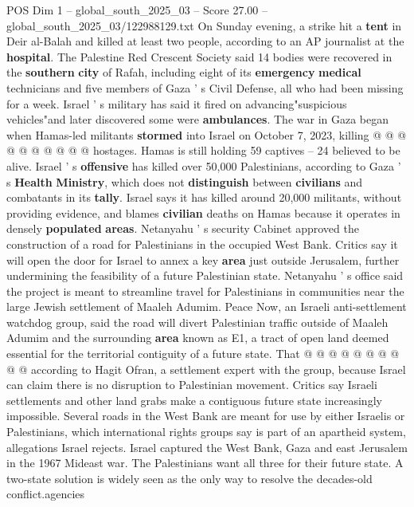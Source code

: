 \begin{textsample}{POS Dim 1 – global\_south\_2025\_03 – Score 27.00 – global\_south\_2025\_03/122988129.txt}
On Sunday evening, a strike hit a \textbf{tent} in Deir al-Balah and killed at least two people, according to an AP journalist at the \textbf{hospital}.
The Palestine Red Crescent Society said 14 bodies were recovered in the \textbf{southern} \textbf{city} of Rafah, including eight of its \textbf{emergency} \textbf{medical} technicians and five members of Gaza ' s Civil Defense, all who had been missing for a week.
Israel ' s military has said it fired on advancing"suspicious vehicles"and later discovered some were \textbf{ambulances}.
The war in Gaza began when Hamas-led militants \textbf{stormed} into Israel on October 7, 2023, killing @ @ @ @ @ @ @ @ @ @ hostages.
Hamas is still holding 59 captives -- 24 believed to be alive.
Israel ' s \textbf{offensive} has killed over 50,000 Palestinians, according to Gaza ' s \textbf{Health} \textbf{Ministry}, which does not \textbf{distinguish} between \textbf{civilians} and combatants in its \textbf{tally}.
Israel says it has killed around 20,000 militants, without providing evidence, and blames \textbf{civilian} deaths on Hamas because it operates in densely \textbf{populated} \textbf{areas}.
Netanyahu ' s security Cabinet approved the construction of a road for Palestinians in the occupied West Bank.
Critics say it will open the door for Israel to annex a key \textbf{area} just outside Jerusalem, further undermining the feasibility of a future Palestinian state.
Netanyahu ' s office said the project is meant to streamline travel for Palestinians in communities near the large Jewish settlement of Maaleh Adumim.
Peace Now, an Israeli anti-settlement watchdog group, said the road will divert Palestinian traffic outside of Maaleh Adumim and the surrounding \textbf{area} known as E1, a tract of open land deemed essential for the territorial contiguity of a future state.
That @ @ @ @ @ @ @ @ @ @ according to Hagit Ofran, a settlement expert with the group, because Israel can claim there is no disruption to Palestinian movement.
Critics say Israeli settlements and other land grabs make a contiguous future state increasingly impossible.
Several roads in the West Bank are meant for use by either Israelis or Palestinians, which international rights groups say is part of an apartheid system, allegations Israel rejects.
Israel captured the West Bank, Gaza and east Jerusalem in the 1967 Mideast war.
The Palestinians want all three for their future state.
A two-state solution is widely seen as the only way to resolve the decades-old conflict.agencies

\end{textsample}
